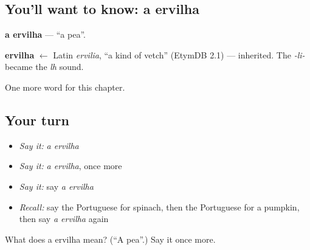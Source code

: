 \subsection*{You'll want to know: a ervilha}
\textbf{a ervilha} — \textquotedblleft{}a pea\textquotedblright{}.

\begin{cousinweb}
\textbf{ervilha} $\leftarrow$ Latin \emph{ervilia}, \textquotedblleft{}a kind of vetch\textquotedblright{} (EtymDB 2.1) — inherited. The \emph{-li-} became the \emph{lh} sound.
\end{cousinweb}

\begin{grammarlens}[title={What you've built}]
One more word for this chapter.
\end{grammarlens}

\subsection*{Your turn}
\begin{itemize}
\raggedright
  \item \emph{Say it:} \emph{a ervilha}
  \item \emph{Say it:} \emph{a ervilha}, once more
  \item \emph{Say it:} say \emph{a ervilha}
  \item \emph{Recall:} say the Portuguese for spinach, then the Portuguese for a pumpkin, then say \emph{a ervilha} again
\end{itemize}

\begin{tcolorbox}[breakable,colback=teal!4,colframe=teal!35!black,title={Before you move on}]
What does a ervilha mean? (\textquotedblleft{}A pea\textquotedblright{}.) Say it once more.
\end{tcolorbox}
